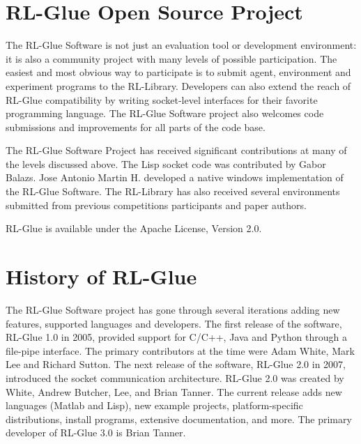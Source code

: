 \documentclass[twopage,11pt]{article}
\begin{document}
 
 
 
\section{RL-Glue Open Source Project}

The RL-Glue Software is not just an evaluation tool or development environment: it is also a community project with many levels of possible participation. The easiest and most obvious way to participate is to submit agent, environment and experiment programs to the RL-Library. Developers can also extend the reach of RL-Glue  compatibility by writing socket-level interfaces for their favorite programming language.  The RL-Glue Software project also welcomes code submissions and improvements for all parts of the code base.   	

The RL-Glue Software Project has received significant contributions at many of the levels discussed above. The Lisp socket code was contributed by Gabor Balazs. Jose Antonio Martin H. developed a native windows implementation of the RL-Glue Software. The RL-Library has also received several environments submitted from previous competitions participants and paper authors. %

RL-Glue is available under the Apache License, Version 2.0.
	

\section{History of RL-Glue}
The RL-Glue Software project has gone through several iterations adding new features, supported languages and developers. The first release of the software, RL-Glue 1.0 in 2005, provided support for C/C++, Java and Python through a file-pipe interface. The primary contributors at the time were Adam White, Mark Lee and Richard Sutton. The next release of the software, RL-Glue 2.0 in 2007, introduced the socket communication architecture. RL-Glue 2.0 was created by White, Andrew Butcher, Lee, and Brian Tanner. The current release adds new languages (Matlab and Lisp), new example projects, platform-specific distributions, install programs, extensive documentation, and more.  The primary developer of RL-Glue 3.0 is Brian Tanner.
   



%
%




\end{document}
